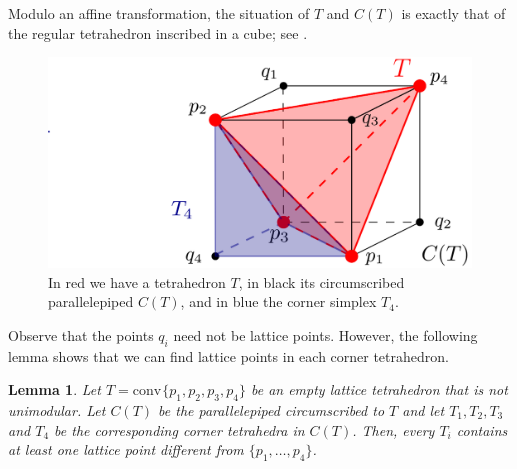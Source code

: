 \documentclass{amsart}
\theoremstyle{plain}
\newtheorem{lemma}[theorem]{Lemma}
\theoremstyle{definition}
\newcommand{\conv}{\ensuremath{\mathrm{conv}}\hspace{1pt}}
\begin{document}
Modulo an affine transformation, the situation of $T$ and $C(T)$ is exactly that of the regular tetrahedron inscribed in a cube; see . 
%
\begin{figure}[htb]
\includegraphics[scale=.25]{circumscribed_parall}
\caption{In red we have a tetrahedron $T$, in black its circumscribed parallelepiped $C(T)$, and in blue the corner simplex $T_4$.}
\label{fig:circumscribed_parall}
\end{figure}

Observe that the points $q_i$ need not be lattice points. However, the following lemma shows that we can find lattice points in each corner tetrahedron.
\begin{lemma}
\label{lemma:corner}
Let $T=\conv\{p_1,p_2,p_3,p_4\}$ be an empty lattice tetrahedron that is not unimodular. Let $C(T)$ be the parallelepiped circumscribed to $T$ and let $T_1, T_2,T_3$ and $T_4$ be the corresponding corner tetrahedra in $C(T)$. Then, every $T_i$ contains at least one lattice point different from $\{p_1,\dots,p_4\}$.
\end{lemma}
\end{document}
